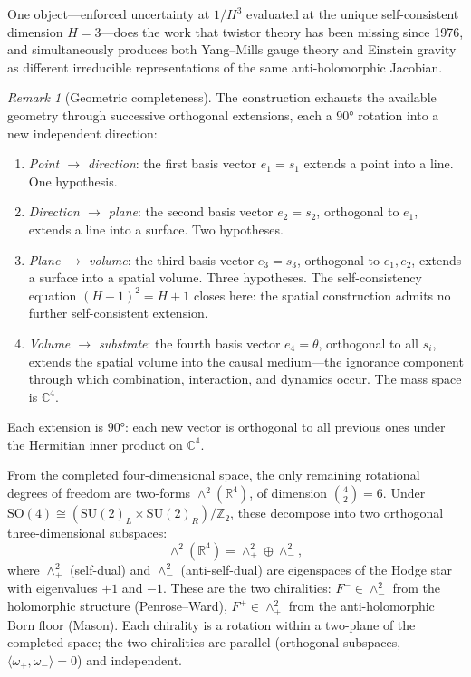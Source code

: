 \documentclass[11pt,a4paper]{article}
\theoremstyle{definition}
\theoremstyle{remark}
\newtheorem{remark}[theorem]{Remark}
\newcommand{\C}{\mathbb{C}}
\newcommand{\R}{\mathbb{R}}
\newcommand{\Z}{\mathbb{Z}}
\newcommand{\SU}{\mathrm{SU}}
\begin{document}
One object---enforced uncertainty at $1/H^3$ evaluated at the unique self-consistent dimension $H=3$---does the work that twistor theory has been missing since 1976, and simultaneously produces both Yang--Mills gauge theory and Einstein gravity as different irreducible representations of the same anti-holomorphic Jacobian.

\begin{remark}[Geometric completeness]\label{rem:geometric_completeness}
The construction exhausts the available geometry through successive orthogonal extensions, each a $90°$ rotation into a new independent direction:
\begin{enumerate}[nosep]
\item \emph{Point $\to$ direction}: the first basis vector $e_1=s_1$ extends a point into a line. One hypothesis.
\item \emph{Direction $\to$ plane}: the second basis vector $e_2=s_2$, orthogonal to $e_1$, extends a line into a surface. Two hypotheses.
\item \emph{Plane $\to$ volume}: the third basis vector $e_3=s_3$, orthogonal to $e_1,e_2$, extends a surface into a spatial volume. Three hypotheses. The self-consistency equation $(H-1)^2=H+1$ closes here: the spatial construction admits no further self-consistent extension.
\item \emph{Volume $\to$ substrate}: the fourth basis vector $e_4=\theta$, orthogonal to all $s_i$, extends the spatial volume into the causal medium---the ignorance component through which combination, interaction, and dynamics occur. The mass space is $\C^4$.
\end{enumerate}

Each extension is $90°$: each new vector is orthogonal to all previous ones under the Hermitian inner product on $\C^4$.

From the completed four-dimensional space, the only remaining rotational degrees of freedom are two-forms $\wedge^2(\R^4)$, of dimension $\binom{4}{2}=6$. Under $\mathrm{SO}(4)\cong(\SU(2)_L\times\SU(2)_R)/\Z_2$, these decompose into two orthogonal three-dimensional subspaces:
\[
\wedge^2(\R^4)=\wedge^2_+\oplus\wedge^2_-,
\]
where $\wedge^2_+$ (self-dual) and $\wedge^2_-$ (anti-self-dual) are eigenspaces of the Hodge star with eigenvalues $+1$ and $-1$. These are the two chiralities: $F^-\in\wedge^2_-$ from the holomorphic structure (Penrose--Ward), $F^+\in\wedge^2_+$ from the anti-holomorphic Born floor (Mason). Each chirality is a rotation within a two-plane of the completed space; the two chiralities are parallel (orthogonal subspaces, $\langle\omega_+,\omega_-\rangle=0$) and independent.


\end{remark}
\end{document}
